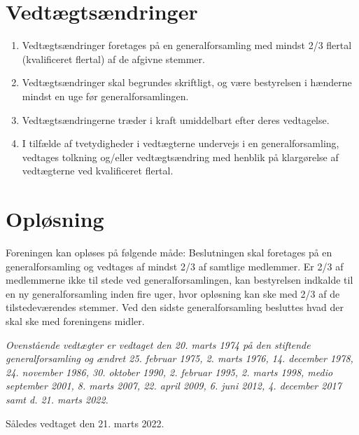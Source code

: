\documentclass[a4paper, 10pt]{article}
\def\vedtagsdato{den 21. marts 2022}
\newenvironment{stykenum}{
  \begin{enumerate}[%
    label=Stk.~\arabic*., ref=\textsection~\theenumi~Stk.~\arabic*, start=1]
}{\end{enumerate}}
\begin{document}
\section{Vedtægtsændringer}
\begin{stykenum}
\item Vedtægtsændringer foretages på en generalforsamling med mindst 2/3
flertal (kvalificeret flertal) af de afgivne stemmer.

\item Vedtægtsændringer skal begrundes skriftligt, og være
bestyrelsen i hænderne mindst en uge før generalforsamlingen.

\item Vedtægtsændringerne træder i kraft umiddelbart efter deres
vedtagelse.

\item I tilfælde af tvetydigheder i vedtægterne undervejs i en
generalforsamling, vedtages tolkning og/eller vedtægtsændring med
henblik på klar\-gørelse af vedtægterne ved kvalificeret flertal.

\end{stykenum}

\section{Opløsning}

Foreningen kan opløses på følgende måde: Beslutningen skal foretages
på en generalforsamling og vedtages af mindst 2/3 af samtlige
medlemmer. Er 2/3 af medlemmerne ikke til stede ved
generalforsamlingen, kan bestyrelsen indkalde til en ny
generalforsamling inden fire uger, hvor opløsning kan ske med 2/3 af
de tilstedeværendes stemmer. Ved den sidste generalforsamling
besluttes hvad der skal ske med foreningens midler.

\vspace{\fill}

\noindent \emph{Ovenstående vedtægter er vedtaget den 20. marts 1974
på den stiftende generalforsamling og ændret 25.  februar 1975, 2.
marts 1976, 14. december 1978, 24. november 1986, 30.  oktober 1990,
2.  februar 1995, 2. marts 1998, medio september 2001, 8. marts 2007,
22. april 2009, 6. juni 2012, 4. december 2017 samt d. 21. marts 2022.}

\bigskip

\noindent Således vedtaget \vedtagsdato{}.
\end{document}

